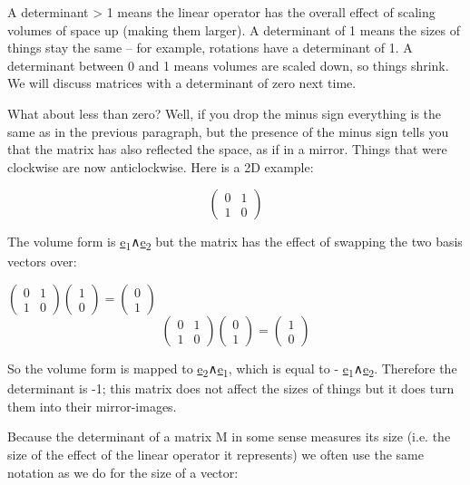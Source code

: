 \documentclass[oneside,english]{amsbook}
\numberwithin{section}{chapter}
\theoremstyle{plain}
\theoremstyle{definition}
\begin{document}
A determinant \textgreater{} 1 means the linear operator has the overall
effect of scaling volumes of space up (making them larger). A
determinant of 1 means the sizes of things stay the same -- for example,
rotations have a determinant of 1. A determinant between 0 and 1 means
volumes are scaled down, so things shrink. We will discuss matrices with
a determinant of zero next time.

What about less than zero? Well, if you drop the minus sign everything
is the same as in the previous paragraph, but the presence of the minus
sign tells you that the matrix has also reflected the space, as if in a
mirror. Things that were clockwise are now anticlockwise. Here is a 2D
example:

\[\begin{pmatrix}
	0 & 1 \\
	1 & 0
\end{pmatrix}\]

The volume form is \ul{e}\textsubscript{1}∧\ul{e}\textsubscript{2} but
the matrix has the effect of swapping the two basis vectors over:

\(\begin{pmatrix}
	0 & 1 \\
	1 & 0
\end{pmatrix}\begin{pmatrix}
	1 \\
	0
\end{pmatrix} = \begin{pmatrix}
	0 \\
	1
\end{pmatrix}\) \(
\)\[\begin{pmatrix}
	0 & 1 \\
	1 & 0
\end{pmatrix}\begin{pmatrix}
	0 \\
	1
\end{pmatrix} = \begin{pmatrix}
	1 \\
	0
\end{pmatrix}\]

So the volume form is mapped to
\ul{e}\textsubscript{2}∧\ul{e}\textsubscript{1}, which is equal to -
\ul{e}\textsubscript{1}∧\ul{e}\textsubscript{2}. Therefore the
determinant is -1; this matrix does not affect the sizes of things but
it does turn them into their mirror-images.

Because the determinant of a matrix M in some sense measures its size
(i.e. the size of the effect of the linear operator it represents) we
often use the same notation as we do for the size of a vector:
\end{document}
